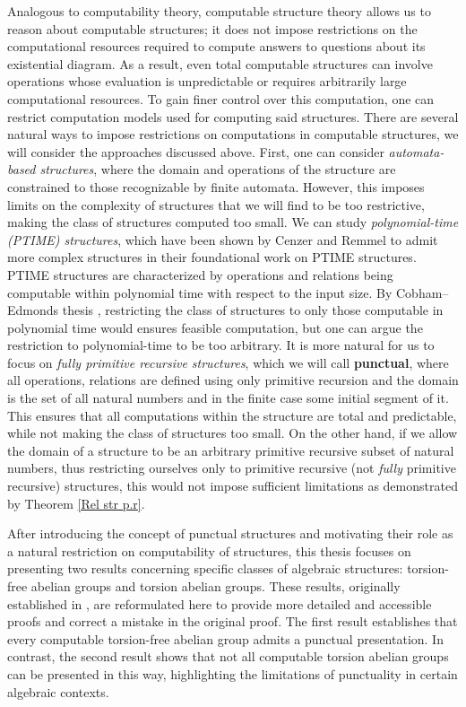 \documentclass{pracalicmgr2025}
\theoremstyle{plain}            %
\theoremstyle{remark}           %
\theoremstyle{definition}       %
\begin{document}
Analogous to computability theory, computable structure theory allows us to reason about computable structures; it does not impose restrictions on the computational resources required to compute answers to questions about its existential diagram. As a result, even total computable structures can involve operations whose evaluation is unpredictable or requires arbitrarily large computational resources. To gain finer control over this computation, one can restrict computation models used for computing said structures. There are several natural ways to impose restrictions on computations in computable structures, we will consider the approaches discussed above. First, one can consider \textit{automata-based structures}, where the domain and operations of the structure are constrained to those recognizable by finite automata. However, this imposes limits on the complexity of structures that we will find to be too restrictive, making the class of structures computed too small. We can study \textit{polynomial-time (PTIME) structures}, which have been shown by Cenzer and Remmel \cite{CENZER199117} to admit more complex structures in their foundational work on PTIME structures. PTIME structures are characterized by operations and relations being computable within polynomial time with respect to the input size. By Cobham–Edmonds thesis \cite{Edmonds_1965, Cobham1965-COBTIC}, restricting the class of structures to only those computable in polynomial time would ensures feasible computation, but one can argue the restriction to polynomial-time to be too arbitrary. It is more natural for us to focus on \textit{fully primitive recursive structures}, which we will call \textbf{punctual}, where all operations, relations are defined using only primitive recursion and the domain is the set of all natural numbers and in the finite case some initial segment of it. This ensures that all computations within the structure are total and predictable, while not making the class of structures too small. On the other hand, if we allow the domain of a structure to be an arbitrary primitive recursive subset of natural numbers, thus restricting ourselves only to primitive recursive (not \textit{fully} primitive recursive) structures, this would not impose sufficient limitations as demonstrated by Theorem \ref{Rel str p.r}.

After introducing the concept of punctual structures and motivating their role as a natural restriction on computability of structures, this thesis focuses on presenting two results concerning specific classes of algebraic structures: torsion-free abelian groups and torsion abelian groups. These results, originally established in \cite{5}, are reformulated here to provide more detailed and accessible proofs and correct a mistake in the original proof. The first result establishes that every computable torsion-free abelian group admits a punctual presentation. In contrast, the second result shows that not all computable torsion abelian groups can be presented in this way, highlighting the limitations of punctuality in certain algebraic contexts.
\end{document}
